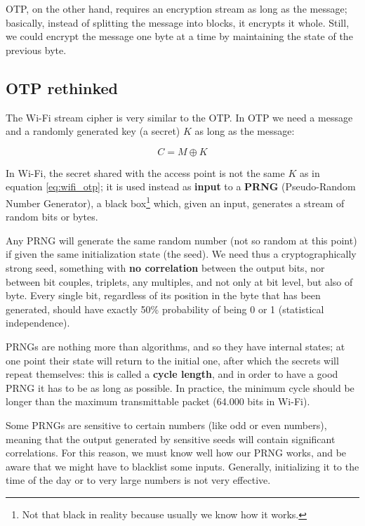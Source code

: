 OTP, on the other hand, requires an encryption stream as long as the message; basically, instead of splitting the message into blocks, it encrypts it whole. Still, we could encrypt the message one byte at a time by maintaining the state of the previous byte.


\subsection{OTP rethinked}
The Wi-Fi stream cipher is very similar to the OTP. In OTP we need a message and a randomly generated key (a secret) $K$ as long as the message:

\begin{equation}
\label{eq:wifi_otp}
        C = M \oplus K
\end{equation}

In Wi-Fi, the secret shared with the access point is not the same $K$ as in equation \ref{eq:wifi_otp}; it is used instead as \textbf{input }to a \textbf{PRNG} (Pseudo-Random Number Generator), a black box\footnote{Not that black in reality because usually we know how it works.} which, given an input, generates a stream of random bits or bytes.

Any PRNG will generate the same random number (not so random at this point) if given the same initialization state (the seed). We need thus a cryptographically strong seed, something with \textbf{no correlation} between the output bits, nor between bit couples, triplets, any multiples, and not only at bit level, but also of byte. Every single bit, regardless of its position in the byte that has been generated, should have exactly 50\% probability of being 0 or 1 (statistical independence).

PRNGs are nothing more than algorithms, and so they have internal states; at one point their state will return to the initial one, after which the secrets will repeat themselves: this is called a \textbf{cycle length}, and in order to have a good PRNG it has to be as long as possible. In practice, the minimum cycle should be longer than the maximum transmittable packet (64.000 bits in Wi-Fi).

Some PRNGs are sensitive to certain numbers (like odd or even numbers), meaning that the output generated by sensitive seeds will contain significant correlations. For this reason, we must know well how our PRNG works, and be aware that we might have to blacklist some inputs. Generally, initializing it to the time of the day or to very large numbers is not very effective.


